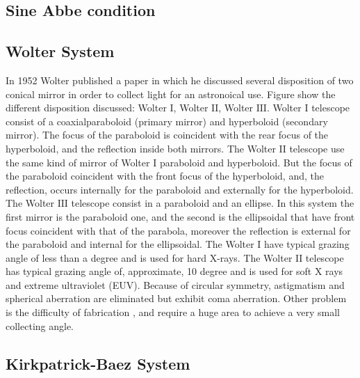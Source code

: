 \subsection{Sine Abbe condition}

\subsection{Wolter System}

\hspace{10mm} In 1952 Wolter published a paper in which he discussed several disposition of two conical mirror in order to collect light for an astronoical use. Figure show the different disposition discussed: Wolter $\mathrm{I} $, Wolter $\mathrm{II} $, Wolter $\mathrm{III} $.
\noindent Wolter $\mathrm{I} $ telescope consist of a coaxialparaboloid (primary mirror) and hyperboloid (secondary mirror). The focus of the paraboloid is coincident with the rear focus of the hyperboloid, and the reflection inside both mirrors. The Wolter $\mathrm{II} $ telescope use the same kind of mirror of Wolter $\mathrm{I} $ paraboloid and hyperboloid. But the focus of the paraboloid coincident with the front focus of the hyperboloid, and, the reflection, occurs internally for the paraboloid and externally for the hyperboloid. The Wolter $\mathrm{III} $ telescope consist in a paraboloid and an ellipse. In this system the first mirror is the paraboloid one, and the second is the ellipsoidal that have front focus coincident with that of the parabola, moreover the reflection is external for the paraboloid and internal for the ellipsoidal.
\noindent The Wolter $\mathrm{I} $ have typical grazing angle of less than a degree and is used for hard X-rays. The Wolter $\mathrm{II} $ telescope has typical grazing angle of, approximate, 10 degree and is used for soft X rays and extreme ultraviolet (EUV).
\noindent Because of circular symmetry, astigmatism and spherical aberration are eliminated but  exhibit coma aberration. Other problem is the difficulty of fabrication , and require a huge area to achieve a very small collecting angle.

\subsection{Kirkpatrick-Baez System}

